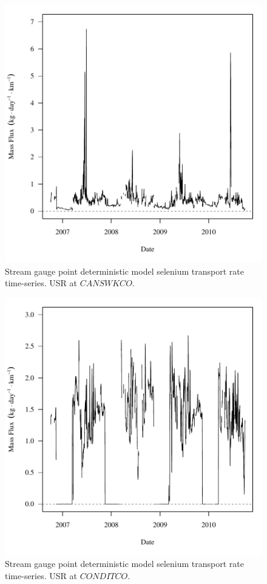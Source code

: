 \begin{figure}[htbp]
	\begin{center}
	\includegraphics[width=6in]{"Figures/Results_DUSR/f CAN"}
	\caption{Stream gauge point deterministic model selenium transport rate time-series.  USR at $CANSWKCO$.}
	\end{center}
\end{figure}
\newpage

\begin{figure}[htbp]
	\begin{center}
	\includegraphics[width=6in]{"Figures/Results_DUSR/f CON"}
	\caption{Stream gauge point deterministic model selenium transport rate time-series.  USR at $CONDITCO$.}
	\end{center}
\end{figure}
\newpage

